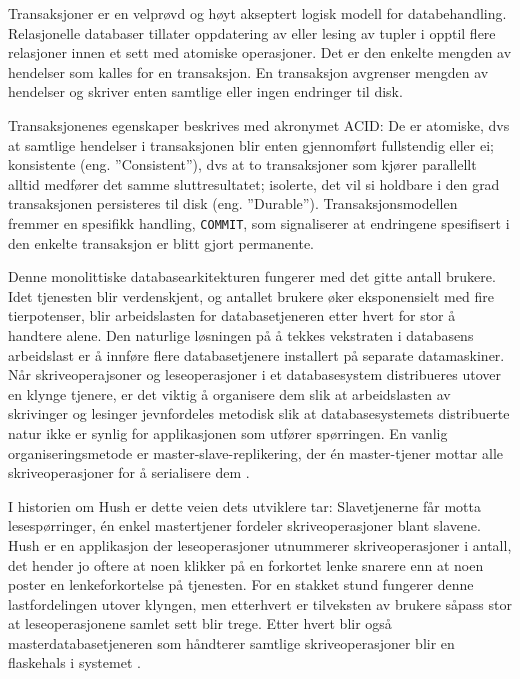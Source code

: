 Transaksjoner er en velprøvd og høyt akseptert logisk modell for databehandling. Relasjonelle databaser tillater oppdatering av eller lesing av tupler i opptil flere relasjoner innen et sett med atomiske operasjoner. Det er den enkelte mengden av hendelser som kalles for en transaksjon. En transaksjon avgrenser mengden av hendelser og skriver enten samtlige eller ingen endringer til disk.

Transaksjonenes egenskaper beskrives med akronymet ACID: De er atomiske, dvs at samtlige hendelser i transaksjonen blir enten gjennomført fullstendig eller ei; konsistente (eng. ''Consistent''), dvs at to transaksjoner som kjører parallellt alltid medfører det samme sluttresultatet; isolerte, det vil si holdbare i den grad transaksjonen persisteres til disk (eng. ''Durable''). Transaksjonsmodellen fremmer en spesifikk handling, \texttt{COMMIT}, som signaliserer at endringene spesifisert i den enkelte transaksjon er blitt gjort permanente.

Denne monolittiske databasearkitekturen fungerer med det gitte antall brukere. Idet tjenesten blir verdenskjent, og antallet brukere øker eksponensielt med fire tierpotenser, blir arbeidslasten for databasetjeneren etter hvert for stor å handtere alene. Den naturlige løsningen på å tekkes vekstraten i databasens arbeidslast er å innføre flere databasetjenere installert på separate datamaskiner. Når skriveoperajsoner og leseoperasjoner i et databasesystem distribueres utover en klynge tjenere, er det viktig å organisere dem slik at arbeidslasten av skrivinger og lesinger jevnfordeles metodisk slik at databasesystemets distribuerte natur ikke er synlig for applikasjonen som utfører spørringen. En vanlig organiseringsmetode er master-slave-replikering, der én master-tjener mottar alle skriveoperasjoner for å serialisere dem \citep{george2011}.

I historien om Hush er dette veien dets utviklere tar: Slavetjenerne får motta lesespørringer, én enkel mastertjener fordeler skriveoperasjoner blant slavene. Hush er en applikasjon der leseoperasjoner utnummerer skriveoperasjoner i antall, det hender jo oftere at noen klikker på en forkortet lenke snarere enn at noen poster en lenkeforkortelse på tjenesten. For en stakket stund fungerer denne lastfordelingen utover klyngen, men etterhvert er tilveksten av brukere såpass stor at leseoperasjonene samlet sett blir trege. Etter hvert blir også masterdatabasetjeneren som håndterer samtlige skriveoperasjoner blir en flaskehals i systemet \citep{george2011}.

